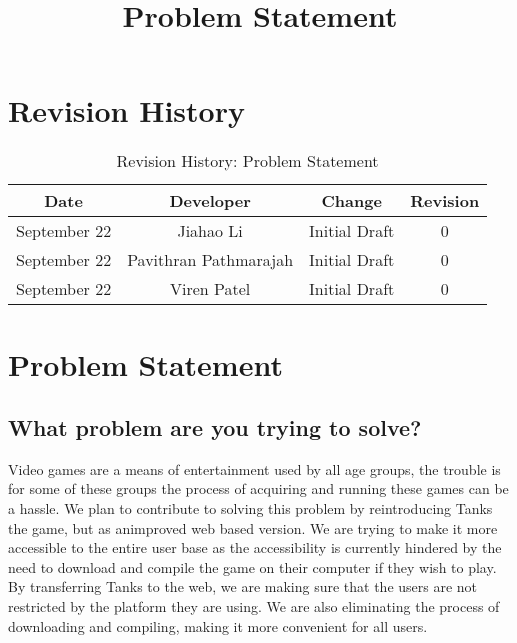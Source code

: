 \documentclass{article}
\begin{document}

\newpage

\title{Problem Statement}\section*{Revision History}

\begin{table}[h!]
  \centering
  \caption{Revision History: Problem Statement}
  \label{tab:table1}
  \begin{tabular}{cccc}
	\toprule
	Date &  Developer & Change & Revision\\
	\midrule
	September 22&Jiahao Li &Initial Draft &0\\
	September 22&Pavithran Pathmarajah &Initial Draft &0\\
	September 22&Viren Patel  &Initial Draft &0\\
	\bottomrule
  \end{tabular}
\end{table}

\newpage

\section*{Problem Statement}

\subsection{What problem are you trying to solve?}
Video games are a means of entertainment used by all age groups, the trouble is for some of these groups the process of acquiring and running these games can be a hassle. We                                plan to contribute to solving this problem by reintroducing Tanks the game, but as animproved web based version. We are trying to make it more accessible to the entire user base as the                                     accessibility is currently hindered by the need to download and compile the game on their computer if they wish to play. By transferring Tanks to the web, we are making sure that the                                     users are not restricted by the platform they are using. We are also eliminating the process of downloading and compiling, making it more convenient for all users. 
\end{document}
